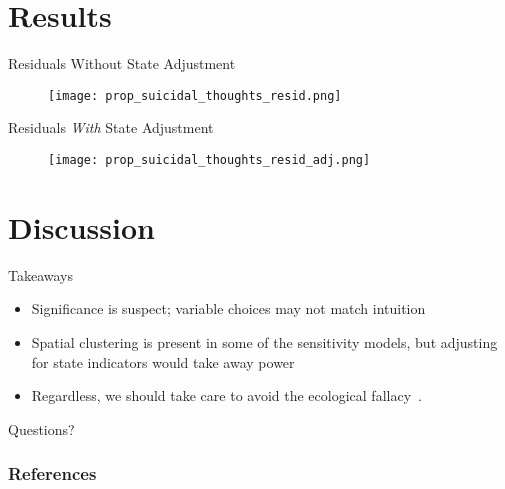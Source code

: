 \documentclass{beamer}
\begin{document}
\section{Results}

\begin{frame}{Residuals Without State Adjustment}
\begin{figure}[!htb]
    \centering
    \texttt{[image: prop\_suicidal\_thoughts\_resid.png]}
\end{figure}
\end{frame}

\begin{frame}{Residuals \textit{With} State Adjustment}
\begin{figure}[!htb]
    \centering
    \texttt{[image: prop\_suicidal\_thoughts\_resid\_adj.png]}
\end{figure}
\end{frame}

\section{Discussion}

\begin{frame}{Takeaways}
    \begin{itemize}
        \item Significance is suspect;
            variable choices may not match intuition\\
        \item Spatial clustering is present in some of the sensitivity models,
            but adjusting for state indicators would take away power\\
        \item Regardless, we should take care to avoid the ecological
            fallacy~\cite{piantadosi_1988}.\\
    \end{itemize}
\end{frame}

\begin{frame}{Questions?}
\end{frame}

\begin{frame}[allowframebreaks]
    \frametitle{References}
    \tiny
    \printbibliography
\end{frame}
\end{document}
